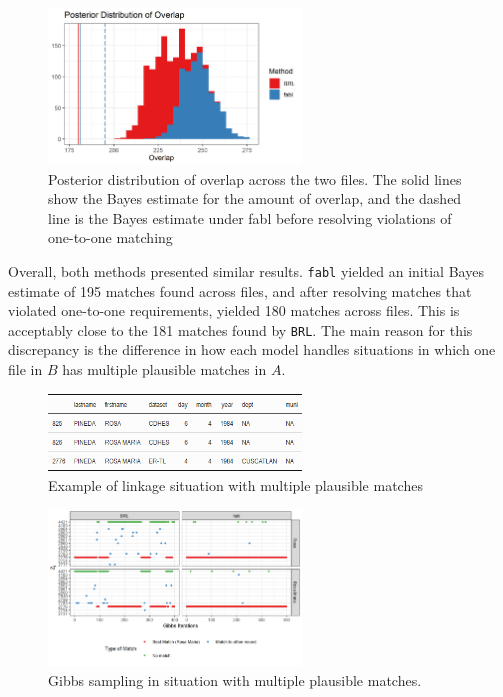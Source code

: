 \documentclass[12pt,letterpaper]{article}
\newcommand{\1}[1]{\mathbb{I}\!\left[#1\right]} %
\begin{document}
\begin{figure}[t]
	
	{\centering \includegraphics[width=0.6\textwidth]{../notes/figures/el_salvador/overlap_distribution_smallP_bayes} 
		
	}
	
	\caption{Posterior distribution of overlap across the two files. The solid lines show the Bayes estimate for the amount of overlap, and the dashed line is the Bayes estimate under fabl before resolving violations of one-to-one matching}\label{fig:overlap-plot}
\end{figure}

Overall, both methods presented similar results. \texttt{fabl} yielded
an initial Bayes estimate of 195 matches found across files, and after
resolving matches that violated one-to-one requirements, yielded 180
matches across files. This is acceptably close to the 181 matches found
by \texttt{BRL}. The main reason for this discrepancy is the difference
in how each model handles situations in which one file in \(B\) has
multiple plausible matches in \(A\).

\begin{figure}[t]
	
	{\centering \includegraphics[width=0.6\textwidth]{../notes/figures/el_salvador/rosa_records} 
		
	}
	
	\caption{Example of linkage situation with multiple plausible matches}\label{fig:rosa-maria}
\end{figure}

\begin{figure}[t]
	
	{\centering \includegraphics[width=0.6\textwidth]{../notes/figures/el_salvador/bad_mixing} 
		
	}
	
	\caption{Gibbs sampling in situation with multiple plausible matches.}\label{fig:mixing-plot}
\end{figure}
\end{document}
